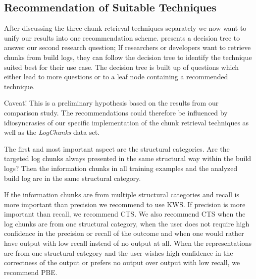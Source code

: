 \subsection{Recommendation of Suitable Techniques}
After discussing the three chunk retrieval techniques separately we
now want to unify our results into one recommendation scheme.
 presents a decision tree
to answer our second research question;
If researchers or developers want to retrieve chunks from build logs,
they can follow the decision tree to identify the technique
suited best for their use case.
The decision tree is built up of questions
which either lead to more questions or to a leaf node containing a
recommended technique.

\begin{simplebox}[minipage boxed title*=-7cm]{Caveat!}
This is a preliminary hypothesis based on the results
from our comparison study.
The recommendations could therefore be
influenced by idiosyncrasies of our specific implementation of the
chunk retrieval techniques as well as the \emph{LogChunks}
data set.
\end{simplebox}

The first and most important aspect are the structural categories.
Are the targeted log chunks always presented in
the same structural way within the build logs? Then the information
chunks in all training examples and the analyzed build log are in the
same structural category.

If the information chunks are from multiple structural categories
and recall is more important than precision we recommend
to use KWS\@.
If precision is more important than recall, we
recommend CTS\@.
We also recommend CTS when the log chunks are
from one structural category, when the user does not require high
confidence in the precision or recall of the outcome and when one
would rather have output with low recall instead of no output at all.
When the representations are from one structural category and the user
wishes high confidence in the correctness of the output or prefers
no output over output with low recall, we recommend PBE\@.

